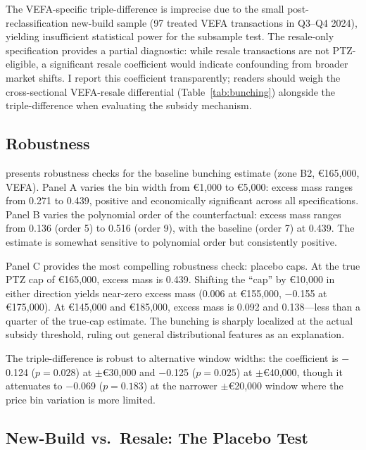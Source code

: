 \documentclass[12pt]{article}
\begin{document}
The VEFA-specific triple-difference is imprecise due to the small post-reclassification new-build sample (97 treated VEFA transactions in Q3--Q4 2024), yielding insufficient statistical power for the subsample test. The resale-only specification provides a partial diagnostic: while resale transactions are not PTZ-eligible, a significant resale coefficient would indicate confounding from broader market shifts. I report this coefficient transparently; readers should weigh the cross-sectional VEFA-resale differential (Table~\ref{tab:bunching}) alongside the triple-difference when evaluating the subsidy mechanism.

\subsection{Robustness}



 presents robustness checks for the baseline bunching estimate (zone B2, \euro165,000, VEFA). Panel A varies the bin width from \euro1,000 to \euro5,000: excess mass ranges from 0.271 to 0.439, positive and economically significant across all specifications. Panel B varies the polynomial order of the counterfactual: excess mass ranges from 0.136 (order 5) to 0.516 (order 9), with the baseline (order 7) at 0.439. The estimate is somewhat sensitive to polynomial order but consistently positive.

Panel C provides the most compelling robustness check: placebo caps. At the true PTZ cap of \euro165,000, excess mass is 0.439. Shifting the ``cap'' by \euro10,000 in either direction yields near-zero excess mass (0.006 at \euro155,000, $-$0.155 at \euro175,000). At \euro145,000 and \euro185,000, excess mass is 0.092 and 0.138---less than a quarter of the true-cap estimate. The bunching is sharply localized at the actual subsidy threshold, ruling out general distributional features as an explanation.

The triple-difference is robust to alternative window widths: the coefficient is $-$0.124 ($p = 0.028$) at $\pm$\euro30,000 and $-$0.125 ($p = 0.025$) at $\pm$\euro40,000, though it attenuates to $-$0.069 ($p = 0.183$) at the narrower $\pm$\euro20,000 window where the price bin variation is more limited.

\subsection{New-Build vs.\ Resale: The Placebo Test}
\end{document}
